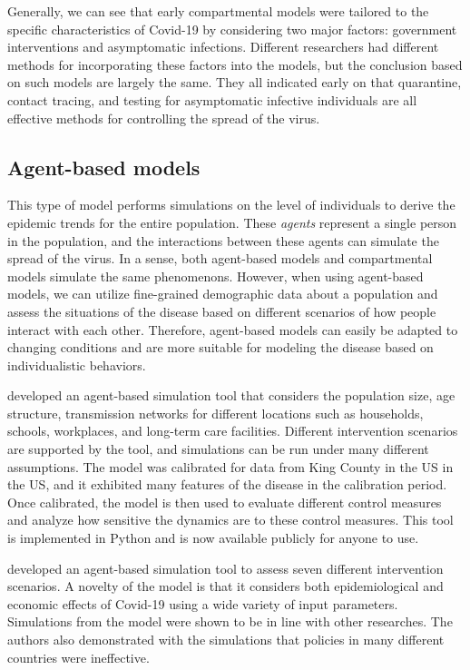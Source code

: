 Generally, we can see that early compartmental models were tailored to the specific characteristics of Covid-19 by considering two major factors: government interventions and asymptomatic infections.
Different researchers had different methods for incorporating these factors into the models, but the conclusion based on such models are largely the same.
They all indicated early on that quarantine, contact tracing, and testing for asymptomatic infective individuals are all effective methods for controlling the spread of the virus.

\subsection{Agent-based models}

This type of model performs simulations on the level of individuals to derive the epidemic trends for the entire population.
These \textit{agents} represent a single person in the population, and the interactions between these agents can simulate the spread of the virus.
In a sense, both agent-based models and compartmental models simulate the same phenomenons.
However, when using agent-based models, we can utilize fine-grained demographic data about a population and assess the situations of the disease based on different scenarios of how people interact with each other.
Therefore, agent-based models can easily be adapted to changing conditions and are more suitable for modeling the disease based on individualistic behaviors.

\citeauthor{kerrCovasimAgentbasedModel2021} \cite{kerrCovasimAgentbasedModel2021} developed an agent-based simulation tool that considers the population size, age structure, transmission networks for different locations such as households, schools, workplaces, and long-term care facilities.
Different intervention scenarios are supported by the tool, and simulations can be run under many different assumptions.
The model was calibrated for data from King County in the \gls{US} in the \gls{US}, and it exhibited many features of the disease in the calibration period.
Once calibrated, the model is then used to evaluate different control measures and analyze how sensitive the dynamics are to these control measures.
This tool is implemented in Python and is now available publicly for anyone to use.

\citeauthor{silvaCOVIDABSAgentbasedModel2020} \cite{silvaCOVIDABSAgentbasedModel2020} developed an agent-based simulation tool to assess seven different intervention scenarios.
A novelty of the model is that it considers both epidemiological and economic effects of Covid-19 using a wide variety of input parameters.
Simulations from the model were shown to be in line with other researches.
The authors also demonstrated with the simulations that policies in many different countries were ineffective.

